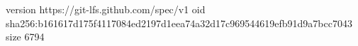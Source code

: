 version https://git-lfs.github.com/spec/v1
oid sha256:b161617d175f4117084ed2197d1eea74a32d17c969544619efb91d9a7bcc7043
size 6794
